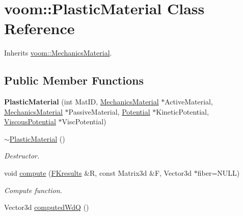 \hypertarget{classvoom_1_1_plastic_material}{
\section{voom::PlasticMaterial Class Reference}
\label{classvoom_1_1_plastic_material}
}


Inherits \hyperlink{classvoom_1_1_mechanics_material}{voom::MechanicsMaterial}.\subsection*{Public Member Functions}
\begin{DoxyCompactItemize}
\item 
\hypertarget{classvoom_1_1_plastic_material_a20d47c770be354c31d296e0739045619}{
{\bfseries PlasticMaterial} (int MatID, \hyperlink{classvoom_1_1_mechanics_material}{MechanicsMaterial} $\ast$ActiveMaterial, \hyperlink{classvoom_1_1_mechanics_material}{MechanicsMaterial} $\ast$PassiveMaterial, \hyperlink{classvoom_1_1_potential}{Potential} $\ast$KineticPotential, \hyperlink{classvoom_1_1_viscous_potential}{ViscousPotential} $\ast$ViscPotential)}
\label{classvoom_1_1_plastic_material_a20d47c770be354c31d296e0739045619}

\item 
\hypertarget{classvoom_1_1_plastic_material_af26654bca102e9ac426e5a01d11dd485}{
\hyperlink{classvoom_1_1_plastic_material_af26654bca102e9ac426e5a01d11dd485}{$\sim$PlasticMaterial} ()}
\label{classvoom_1_1_plastic_material_af26654bca102e9ac426e5a01d11dd485}

\begin{DoxyCompactList}\small\item\em Destructor. \item\end{DoxyCompactList}\item 
\hypertarget{classvoom_1_1_plastic_material_af6b63ab69c8a8b8b919014bf3fce0807}{
void \hyperlink{classvoom_1_1_plastic_material_af6b63ab69c8a8b8b919014bf3fce0807}{compute} (\hyperlink{structvoom_1_1_mechanics_material_1_1_f_kresults}{FKresults} \&R, const Matrix3d \&F, Vector3d $\ast$fiber=NULL)}
\label{classvoom_1_1_plastic_material_af6b63ab69c8a8b8b919014bf3fce0807}

\begin{DoxyCompactList}\small\item\em Compute function. \item\end{DoxyCompactList}\item 
\hypertarget{classvoom_1_1_plastic_material_af0a7c1b596b35566107c86e9aa0d11c6}{
Vector3d \hyperlink{classvoom_1_1_plastic_material_af0a7c1b596b35566107c86e9aa0d11c6}{computedWdQ} ()}
\label{classvoom_1_1_plastic_material_af0a7c1b596b35566107c86e9aa0d11c6}


\end{DoxyCompactItemize}

